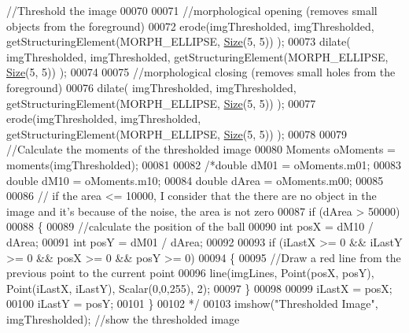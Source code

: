 \begin{DoxyCode}
{      //Threshold the image}
00070 
00071             \textcolor{comment}{//morphological opening (removes small objects from the foreground)}
00072             erode(imgThresholded, imgThresholded, getStructuringElement(MORPH\_ELLIPSE, 
      \hyperlink{definitions_8hpp_a9809446fd16a744b6df9808293f14153}{Size}(5, 5)) );
00073             dilate( imgThresholded, imgThresholded, getStructuringElement(MORPH\_ELLIPSE, 
      \hyperlink{definitions_8hpp_a9809446fd16a744b6df9808293f14153}{Size}(5, 5)) ); 
00074 
00075             \textcolor{comment}{//morphological closing (removes small holes from the foreground)}
00076             dilate( imgThresholded, imgThresholded, getStructuringElement(MORPH\_ELLIPSE, 
      \hyperlink{definitions_8hpp_a9809446fd16a744b6df9808293f14153}{Size}(5, 5)) ); 
00077             erode(imgThresholded, imgThresholded, getStructuringElement(MORPH\_ELLIPSE, 
      \hyperlink{definitions_8hpp_a9809446fd16a744b6df9808293f14153}{Size}(5, 5)) );
00078 
00079             \textcolor{comment}{//Calculate the moments of the thresholded image}
00080             Moments oMoments = moments(imgThresholded);
00081 
00082             \textcolor{comment}{/*double dM01 = oMoments.m01;}
00083 \textcolor{comment}{              double dM10 = oMoments.m10;}
00084 \textcolor{comment}{              double dArea = oMoments.m00;}
00085 \textcolor{comment}{}
00086 \textcolor{comment}{            // if the area <= 10000, I consider that the there are no object in the image and it's because
       of the noise, the area is not zero }
00087 \textcolor{comment}{            if (dArea > 50000)}
00088 \textcolor{comment}{            \{}
00089 \textcolor{comment}{            //calculate the position of the ball}
00090 \textcolor{comment}{            int posX = dM10 / dArea;}
00091 \textcolor{comment}{            int posY = dM01 / dArea;        }
00092 \textcolor{comment}{}
00093 \textcolor{comment}{            if (iLastX >= 0 && iLastY >= 0 && posX >= 0 && posY >= 0)}
00094 \textcolor{comment}{            \{}
00095 \textcolor{comment}{            //Draw a red line from the previous point to the current point}
00096 \textcolor{comment}{            line(imgLines, Point(posX, posY), Point(iLastX, iLastY), Scalar(0,0,255), 2);}
00097 \textcolor{comment}{            \}}
00098 \textcolor{comment}{}
00099 \textcolor{comment}{            iLastX = posX;}
00100 \textcolor{comment}{            iLastY = posY;}
00101 \textcolor{comment}{            \}}
00102 \textcolor{comment}{            */}
00103             imshow(\textcolor{stringliteral}{"Thresholded Image"}, imgThresholded); \textcolor{comment}{//show the thresholded image}

\end{DoxyCode}
